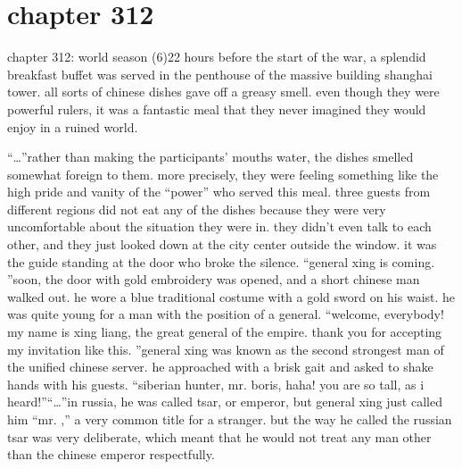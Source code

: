 \section{chapter 312}

chapter 312: world season (6)22 hours before the start of the war, a splendid breakfast buffet was served in the penthouse of the massive building shanghai tower.
 all sorts of chinese dishes gave off a greasy smell.
 even though they were powerful rulers, it was a fantastic meal that they never imagined they would enjoy in a ruined world.





“…”rather than making the participants’ mouths water, the dishes smelled somewhat foreign to them.
 more precisely, they were feeling something like the high pride and vanity of the “power” who served this meal.
three guests from different regions did not eat any of the dishes because they were very uncomfortable about the situation they were in.
 they didn’t even talk to each other, and they just looked down at the city center outside the window.
it was the guide standing at the door who broke the silence.
“general xing is coming.
”soon, the door with gold embroidery was opened, and a short chinese man walked out.
he wore a blue traditional costume with a gold sword on his waist.
 he was quite young for a man with the position of a general.
“welcome, everybody! my name is xing liang, the great general of the empire.
 thank you for accepting my invitation like this.
”general xing was known as the second strongest man of the unified chinese server.
he approached with a brisk gait and asked to shake hands with his guests.
“siberian hunter, mr.
 boris, haha! you are so tall, as i heard!”“…”in russia, he was called tsar, or emperor, but general xing just called him “mr.
,” a very common title for a stranger.
but the way he called the russian tsar was very deliberate, which meant that he would not treat any man other than the chinese emperor respectfully.

